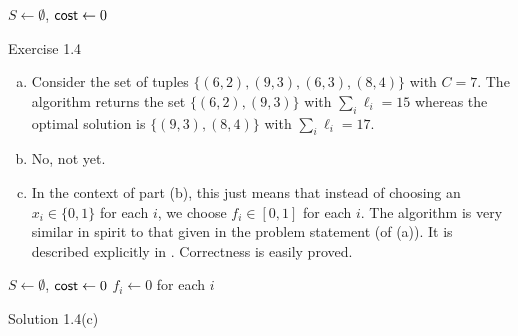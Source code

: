 \begin{algorithm}
	\DontPrintSemicolon
	\SetNoFillComment
	 
	$S\gets\emptyset$, $\mathsf{cost}\gets 0$\;
	\caption{Exercise 1.4}\label{algo: ex 1.4}
\end{algorithm}

\begin{solution*}
	\begin{enumerate}[(a)]
		\item Consider the set of tuples $\{(6,2),(9,3),(6,3),(8,4)\}$ with $C=7$. The algorithm returns the set $\{(6,2),(9,3)\}$ with $\sum_i \ell_i=15$ whereas the optimal solution is $\{(9,3),(8,4)\}$ with $\sum_i \ell_i = 17$.

		\item No, not yet.

		\item In the context of part (b), this just means that instead of choosing an $x_i\in\{0,1\}$ for each $i$, we choose $f_i\in[0,1]$ for each $i$. The algorithm is very similar in spirit to that given in the problem statement (of (a)). It is described explicitly in . Correctness is easily proved.

	\end{enumerate}
\end{solution*}


\begin{algorithm}[H]
	\DontPrintSemicolon
	\SetNoFillComment
	\;
	$S\gets\emptyset$, $\mathsf{cost}\gets 0$\;
	$f_i\gets 0$ for each $i$\;
	\caption{Solution 1.4(c)}\label{algo: sol 1.4(c)}
\end{algorithm}

